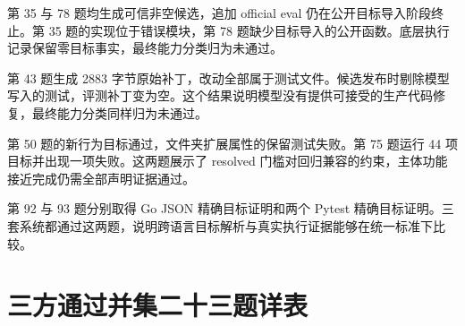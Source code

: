 \documentclass[11pt,a4paper,fontset=fandol]{ctexart}
\begin{document}
第 35 与 78 题均生成可信非空候选，追加 official eval 仍在公开目标导入阶段终止。第 35 题的实现位于错误模块，第 78 题缺少目标导入的公开函数。底层执行记录保留零目标事实，最终能力分类归为未通过。

第 43 题生成 2883 字节原始补丁，改动全部属于测试文件。候选发布时剔除模型写入的测试，评测补丁变为空。这个结果说明模型没有提供可接受的生产代码修复，最终能力分类同样归为未通过。

第 50 题的新行为目标通过，文件夹扩展属性的保留测试失败。第 75 题运行 44 项目标并出现一项失败。这两题展示了 resolved 门槛对回归兼容的约束，主体功能接近完成仍需全部声明证据通过。

第 92 与 93 题分别取得 Go JSON 精确目标证明和两个 Pytest 精确目标证明。三套系统都通过这两题，说明跨语言目标解析与真实执行证据能够在统一标准下比较。

\section{三方通过并集二十三题详表}
\end{document}

